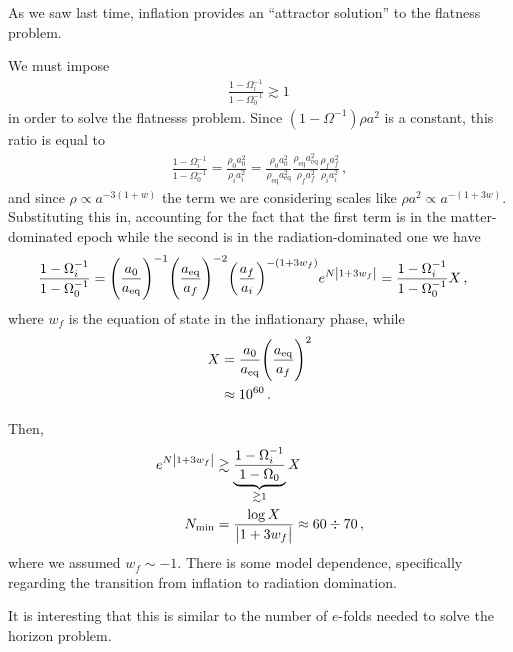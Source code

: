 \documentclass[main.tex]{subfiles}
\begin{document}

As we saw last time, inflation provides an ``attractor solution'' to the flatness problem. 

We must impose 
%
\begin{align}
\frac{1 - \Omega _i^{-1}}{1 - \Omega_0^{-1}} \gtrsim 1
\,
\end{align}
%
in order to solve the flatnesss problem. 
Since \(( 1- \Omega^{-1}) \rho a^2\) is a constant, this ratio is equal to 
%
\begin{align}
\frac{1 - \Omega _i^{-1}}{1 - \Omega_0^{-1}}
= 
\frac{\rho_0 a_0^2}{\rho _i a_i^2} 
= 
\frac{\rho_0 a_0^2}{\rho _{\text{eq}} a _{\text{eq}}^2}
\frac{{\rho _{\text{eq}} a _{\text{eq}}^2}}{\rho _f a_f^2} 
\frac{\rho _f a _f^2}{\rho _i a_i^2} 
\,,
\end{align}
%
and since \(\rho \propto a^{-3 (1+w)}\) the term we are considering scales like \(\rho a^2 \propto a^{-(1 + 3w)}\). 
Substituting this in, accounting for the fact that the first term is in the matter-dominated epoch while the second is in the radiation-dominated one we have 
%
\begin{align}
\frac{1 - \Omega _i^{-1}}{1 - \Omega_0^{-1}}
&= 
\qty(\frac{a_0 }{ a _{\text{eq}}})^{-1} 
\qty(\frac{a _{\text{eq}}}{a_f})^{-2}
\qty(\frac{a_f}{ a_i})^{-(1 + 3 w_f)}
e^{N \abs{1 + 3 w_f}} = \frac{1 - \Omega_i^{-1}}{1 - \Omega_0^{-1}} X
\,,
\end{align}
%
where \(w_f\) is the equation of state in the inflationary phase, while 
%
\begin{align}
X &= \frac{a_0 }{ a _{\text{eq}}}\qty(\frac{a _{\text{eq}}}{a_f})^2 \\
&\approx 10^{\num{60}}
\,.
\end{align}

Then, 
%
\begin{align}
e^{N \abs{1 + 3 w_f}} &\gtrsim \underbrace{\frac{1 - \Omega _i^{-1}}{1-\Omega_0 }}_{\gtrsim 1} X \\
N _{\text{min}} &= \frac{\log X}{\abs{1 + 3 w_f }} \approx 60 \divisionsymbol 70
\,,
\end{align}
%
where we assumed \(w_f \sim -1\). There is some model dependence, specifically regarding the transition from inflation to radiation domination. 

It is interesting that this is similar to the number of \(e\)-folds needed to solve the horizon problem. 
\end{document}
